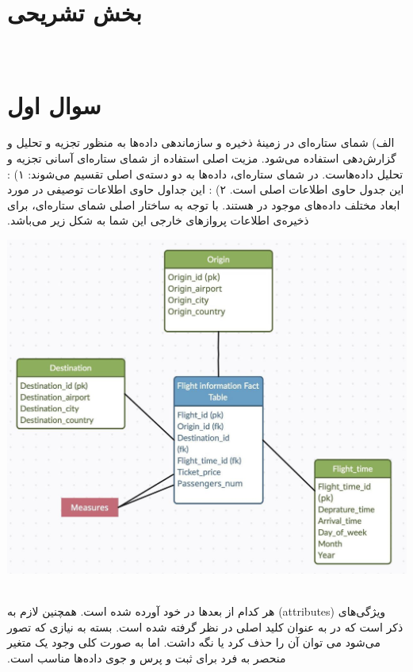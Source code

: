 ‫
‫‫\section*{بخش تشریحی}
‫‫‫\section{سوال اول}
‫
‫الف) شمای ستاره‌ای در زمینهٔ ذخیره و سازماندهی داده‌ها به منظور تجزیه و تحلیل و گزارش‌دهی استفاده می‌شود. مزیت اصلی استفاده از شمای ستاره‌ای آسانی  تجزیه و تحلیل داده‌هاست. در شمای ستاره‌ای، داده‌ها به دو دسته‌ی اصلی تقسیم می‌شوند: \newline
‫۱) : این جدول حاوی اطلاعات اصلی است. \newline
‫۲) : این جداول حاوی اطلاعات توصیفی در مورد ابعاد مختلف داده‌های موجود در  هستند. \newline
‫با توجه به ساختار اصلی شمای‌ ستاره‌ای، برای ذخیره‌ی اطلاعات پروازهای خارجی این شما به شکل زیر می‌باشد.
‫
‫\begin{center}
‫\includegraphics[scale=0.35]{figs/star_schema1.png}
‫\end{center}
‫
‫ویژگی‌های (attributes) هر کدام از بعدها در  خود آورده شده است. همچنین لازم به ذکر است که  در  به عنوان کلید اصلی در نظر گرفته شده است. بسته به نیازی که تصور می‌شود می توان آن را حذف کرد یا نگه داشت. اما به صورت کلی وجود یک متغیر منحصر به فرد برای ثبت و پرس و جوی داده‌ها مناسب است.
‫\vspace{1cm}
